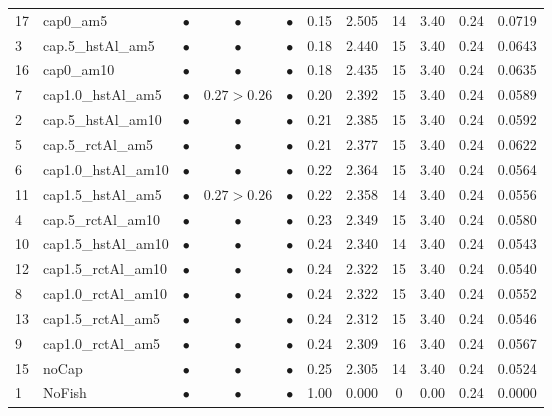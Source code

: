 \documentclass[11pt]{book}
\begin{document}
\begin{landscape}
\begin{longtable}[t]{llccccccccc}
17 & cap0\_am5 & $\bullet$ & $\bullet$ & $\bullet$ & 0.15 & 2.505 & 14 & 3.40 & 0.24 & 0.0719\\
3 & cap.5\_hstAl\_am5 & $\bullet$ & $\bullet$ & $\bullet$ & 0.18 & 2.440 & 15 & 3.40 & 0.24 & 0.0643\\
16 & cap0\_am10 & $\bullet$ & $\bullet$ & $\bullet$ & 0.18 & 2.435 & 15 & 3.40 & 0.24 & 0.0635\\
7 & cap1.0\_hstAl\_am5 & $\bullet$ & $0.27>0.26$ & $\bullet$ & 0.20 & 2.392 & 15 & 3.40 & 0.24 & 0.0589\\
2 & cap.5\_hstAl\_am10 & $\bullet$ & $\bullet$ & $\bullet$ & 0.21 & 2.385 & 15 & 3.40 & 0.24 & 0.0592\\
5 & cap.5\_rctAl\_am5 & $\bullet$ & $\bullet$ & $\bullet$ & 0.21 & 2.377 & 15 & 3.40 & 0.24 & 0.0622\\
6 & cap1.0\_hstAl\_am10 & $\bullet$ & $\bullet$ & $\bullet$ & 0.22 & 2.364 & 15 & 3.40 & 0.24 & 0.0564\\
11 & cap1.5\_hstAl\_am5 & $\bullet$ & $0.27>0.26$ & $\bullet$ & 0.22 & 2.358 & 14 & 3.40 & 0.24 & 0.0556\\
4 & cap.5\_rctAl\_am10 & $\bullet$ & $\bullet$ & $\bullet$ & 0.23 & 2.349 & 15 & 3.40 & 0.24 & 0.0580\\
10 & cap1.5\_hstAl\_am10 & $\bullet$ & $\bullet$ & $\bullet$ & 0.24 & 2.340 & 14 & 3.40 & 0.24 & 0.0543\\
12 & cap1.5\_rctAl\_am10 & $\bullet$ & $\bullet$ & $\bullet$ & 0.24 & 2.322 & 15 & 3.40 & 0.24 & 0.0540\\
8 & cap1.0\_rctAl\_am10 & $\bullet$ & $\bullet$ & $\bullet$ & 0.24 & 2.322 & 15 & 3.40 & 0.24 & 0.0552\\
13 & cap1.5\_rctAl\_am5 & $\bullet$ & $\bullet$ & $\bullet$ & 0.24 & 2.312 & 15 & 3.40 & 0.24 & 0.0546\\
9 & cap1.0\_rctAl\_am5 & $\bullet$ & $\bullet$ & $\bullet$ & 0.24 & 2.309 & 16 & 3.40 & 0.24 & 0.0567\\
15 & noCap & $\bullet$ & $\bullet$ & $\bullet$ & 0.25 & 2.305 & 14 & 3.40 & 0.24 & 0.0524\\
1 & NoFish & $\bullet$ & $\bullet$ & $\bullet$ & 1.00 & 0.000 & 0 & 0.00 & 0.24 & 0.0000\\*
\end{longtable}
\end{landscape}
\endgroup{}

\newpage
\end{document}
